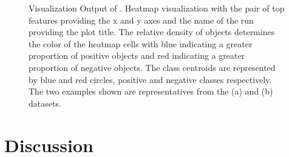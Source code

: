 \begin{figure}[h]
\vspace{-5mm}
\centering %
{}
\vspace{-5mm}
\caption{Visualization Output of \genviz. Heatmap visualization with the pair of top features providing the x and y axes and the name of the run providing the plot title. The relative density of objects determines the color of the heatmap cells with blue indicating a greater proportion of positive objects and red indicating a greater proportion of negative objects. The class centroids are represented by blue and red circles, positive and negative classes respectively. The two examples shown are representatives from the (a) \msig and (b) \lincs datasets. }
\vspace{-5mm}
\label{fig:viz}
\end{figure}

\section{Discussion}\label{sec:disc}

